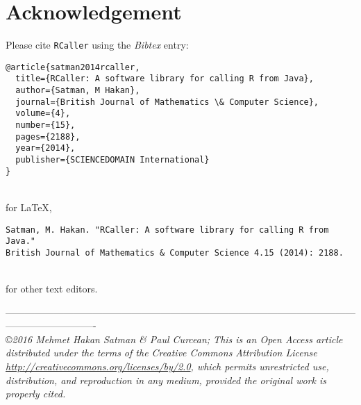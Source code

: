 \documentclass[10pt,a4paper, final, oneside]{article}
\begin{document}



%






\newpage
\section*{Acknowledgement}
Please cite \texttt{RCaller} using the \emph{Bibtex} entry: \\

\begin{minipage}{\linewidth}
\begin{verbatim}
@article{satman2014rcaller,
  title={RCaller: A software library for calling R from Java},
  author={Satman, M Hakan},
  journal={British Journal of Mathematics \& Computer Science},
  volume={4},
  number={15},
  pages={2188},
  year={2014},
  publisher={SCIENCEDOMAIN International}
}
\end{verbatim}
\end{minipage}

\noindent \\ for \LaTeX,  \\

\begin{minipage}{\linewidth}
\begin{verbatim}
Satman, M. Hakan. "RCaller: A software library for calling R from Java." 
British Journal of Mathematics & Computer Science 4.15 (2014): 2188.
\end{verbatim}
\end{minipage}

\noindent \\ for other text editors.


\scriptsize\-----------------------------------------------------------------------------------------------------------------------------------------\\\copyright \it 2016  Mehmet Hakan Satman \& Paul Curcean; This is an Open Access article distributed under the terms of the Creative Commons Attribution License
\href{http://creativecommons.org/licenses/by/2.0}{http://creativecommons.org/licenses/by/2.0},  which permits unrestricted use, distribution, and reproduction in any medium,
provided the original work is properly cited.
\end{document}
